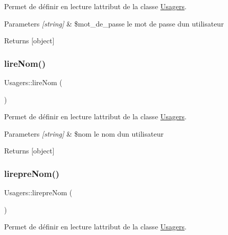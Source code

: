Permet de définir en lecture l\textquotesingle{}attribut de la classe \hyperlink{class_usagers}{Usagers}. 


\begin{DoxyParams}{Parameters}
{\em \mbox{[}string\mbox{]}} & \$mot\+\_\+de\+\_\+passe le mot de passe d\textquotesingle{}un utilisateur \\
\hline
\end{DoxyParams}
\begin{DoxyReturn}{Returns}
\mbox{[}object\mbox{]} 
\end{DoxyReturn}
\mbox{\label{class_usagers_a396be2eee626fc4f257948096a5b8fa0}} 
\subsubsection{\texorpdfstring{lire\+Nom()}{lireNom()}}
{\footnotesize\ttfamily Usagers\+::lire\+Nom (\begin{DoxyParamCaption}{ }\end{DoxyParamCaption})}



Permet de définir en lecture l\textquotesingle{}attribut de la classe \hyperlink{class_usagers}{Usagers}. 


\begin{DoxyParams}{Parameters}
{\em \mbox{[}string\mbox{]}} & \$nom le nom d\textquotesingle{}un utilisateur \\
\hline
\end{DoxyParams}
\begin{DoxyReturn}{Returns}
\mbox{[}object\mbox{]} 
\end{DoxyReturn}
\mbox{\label{class_usagers_a8671a3cff3d5271fb635dd712396924b}} 
\subsubsection{\texorpdfstring{lirepre\+Nom()}{lirepreNom()}}
{\footnotesize\ttfamily Usagers\+::lirepre\+Nom (\begin{DoxyParamCaption}{ }\end{DoxyParamCaption})}



Permet de définir en lecture l\textquotesingle{}attribut de la classe \hyperlink{class_usagers}{Usagers}. 


